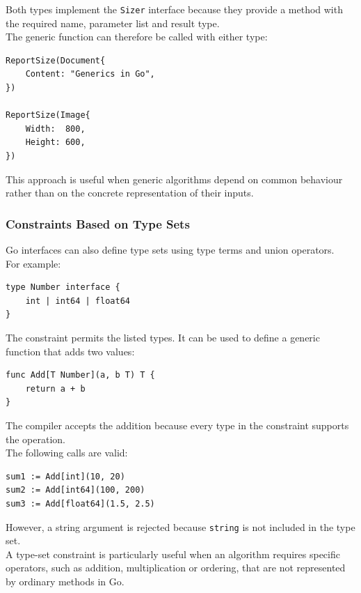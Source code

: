 Both types implement the \texttt{Sizer} interface because they provide a method with the required name, parameter list and result type.\\

The generic function can therefore be called with either type:

\begin{lstlisting}
ReportSize(Document{
    Content: "Generics in Go",
})

ReportSize(Image{
    Width:  800,
    Height: 600,
})
\end{lstlisting}

This approach is useful when generic algorithms depend on common behaviour rather than on the concrete representation of their inputs.\\

\subsubsection{Constraints Based on Type Sets}

Go interfaces can also define type sets using type terms and union operators.\\

For example:

\begin{lstlisting}
type Number interface {
    int | int64 | float64
}
\end{lstlisting}

The constraint permits the listed types. It can be used to define a generic function that adds two values:

\begin{lstlisting}
func Add[T Number](a, b T) T {
    return a + b
}
\end{lstlisting}

The compiler accepts the addition because every type in the constraint supports the operation.\\

The following calls are valid:

\begin{lstlisting}
sum1 := Add[int](10, 20)
sum2 := Add[int64](100, 200)
sum3 := Add[float64](1.5, 2.5)
\end{lstlisting}

However, a string argument is rejected because \texttt{string} is not included in the type set.\\

A type-set constraint is particularly useful when an algorithm requires specific operators, such as addition, multiplication or ordering, that are not represented by ordinary methods in Go.\\

